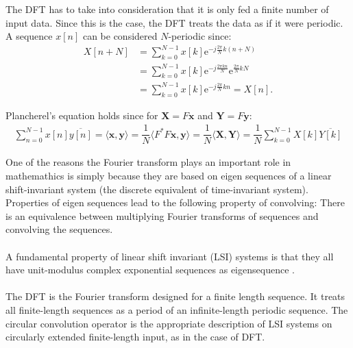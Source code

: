The DFT has to take into consideration that it is only fed a finite number of input data. Since this is the case, the DFT treats the data as if it were periodic. A sequence $x[n]$ can be considered $N$-periodic since:
\begin{align*}
	X[n+N]
	&= \sum_{k=0}^{N-1} x[k] \text{e}^{-j \frac{2 \pi}{N}  k (n		+N)} \\
	&= \sum_{k=0}^{N-1} x[k] \text{e}^{-j \frac{2 \pi k n}{N}}		\text{e}^{\frac{2 \pi}{N} kN} \\
	&= \sum_{k=0}^{N-1} x[k] \text{e}^{-j \frac{2 \pi}{N} k n} 		= X[n].
\end{align*}

Plancherel's equation holds since for $\textbf{X} = F\textbf{x}$ and $\textbf{Y} = F\textbf{y}$:
\begin{align*}
\sum_{n=0}^{N-1} x[n] \overline{y[n]} = \langle \textbf{x},\textbf{y} \rangle = \dfrac{1}{N} \langle F^*F\textbf{x},\textbf{y} \rangle = \dfrac{1}{N} \langle \textbf{X},\textbf{Y} \rangle = \dfrac{1}{N} \sum_{k=0}^{N-1} X[k] \overline{Y[k]}
\end{align*}

One of the reasons the Fourier transform plays an important role in mathemathics is simply because they are based on eigen sequences of a linear shift-invariant system (the discrete equivalent of time-invariant system).
Properties of eigen sequences lead to the following property of convolving:
There is an equivalence between multiplying Fourier transforms of sequences and convolving the sequences.
\\ \\
A fundamental property of linear shift invariant (LSI) systems is that they all have unit-modulus complex exponential sequences as eigensequence \cite{FSP} .
\\ \\
The DFT is the Fourier transform designed for a finite length sequence.
It treats all finite-length sequences as a period of an infinite-length periodic sequence.
The circular convolution operator is the appropriate description of LSI systems on circularly extended finite-length input, as in the case of DFT. 

